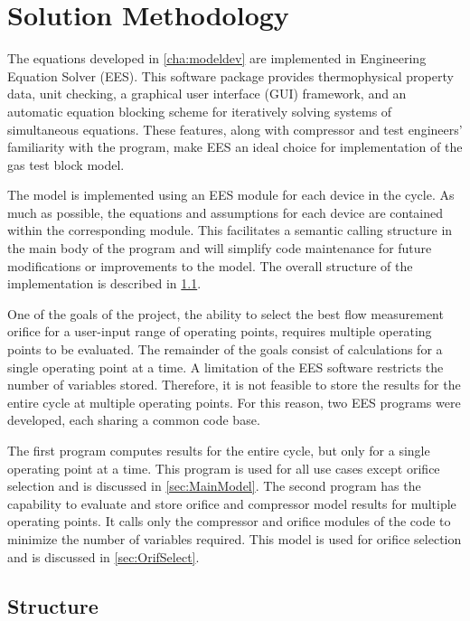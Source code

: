 \chapter{Solution Methodology} \label{cha:solnmethod}

The equations developed in \cref{cha:modeldev} are implemented in
Engineering Equation Solver (EES). 
This software package provides thermophysical property data, unit checking, 
a graphical user interface (GUI) framework, and an automatic equation 
blocking scheme for iteratively solving systems of simultaneous equations. 
These features, along with compressor and test engineers' familiarity with the program, 
make EES an ideal choice for implementation of the gas test block model.

The model is implemented using an EES module for each device in the cycle. 
As much as possible, the equations and assumptions for each device are contained
within the corresponding module.
This facilitates a semantic calling structure in the main body of the program 
and will simplify code maintenance for future modifications or improvements 
to the model.
The overall structure of the implementation is described in \cref{sec:Overall}.

One of the goals of the project, the ability to select the best flow measurement
orifice for a user-input range of operating points, requires multiple operating points
to be evaluated.
The remainder of the goals consist of calculations for a single operating point at a time.
A limitation of the EES software restricts the number of variables stored.
Therefore, it is not feasible to store the results for the entire cycle at multiple operating points.
For this reason, two EES programs were developed, each sharing a common code base. 

The first program computes results for the entire cycle, but only 
for a single operating point at a time.
This program is used for all use cases except orifice selection
and is discussed in \cref{sec:MainModel}.
The second program has the capability to evaluate and store orifice and 
compressor model results for multiple operating points.
It calls only the compressor and orifice modules of the code to minimize the number of variables required.
This model is used for orifice selection and is discussed in \cref{sec:OrifSelect}.

\section{Structure} \label{sec:Overall}

